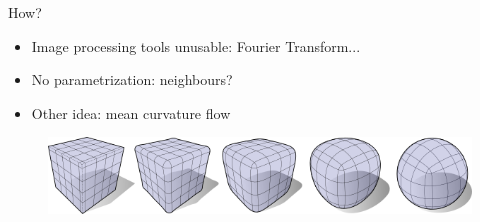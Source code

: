 \documentclass{beamer}
\begin{document}
\begin{frame}[allowframebreaks]
    \newpage
    How?
    \begin{itemize}
        \item Image processing tools unusable: Fourier Transform...
        \item No parametrization: neighbours?
        \item Other idea: mean curvature flow
    \end{itemize}

    \begin{figure}
        \centering
        \includegraphics[scale=0.3]{img/mean-curvature-flow-cube}
    \end{figure}
\end{frame}
\end{document}
